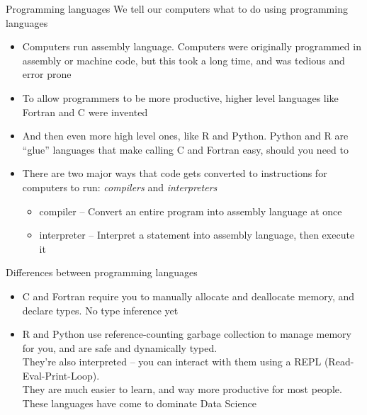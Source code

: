 \documentclass{beamer}
\begin{document}
\begin{frame}{Programming languages}
	We tell our computers what to do using programming languages
	\begin{itemize}	

		\item Computers run assembly language. Computers were originally
		programmed in assembly or machine code, but this took a long time, and
		was tedious and error prone
		
		\item To allow programmers to be more productive, higher level languages
		like Fortran and C were invented

\item  And then even more high level ones, like R and Python. Python and R are
``glue'' languages that make calling C and Fortran easy, should you need to

		\item There are two major ways that code gets converted to instructions for computers to run: \emph{compilers} and \emph{interpreters}
			\begin{itemize}
				\item{compiler} -- Convert an entire program into assembly language at once
				\item{interpreter} -- Interpret a statement into assembly language, then execute it
			\end{itemize}
	\end{itemize}
\end{frame}

\begin{frame}{Differences between programming languages}
	\begin{itemize}	
		\item C and Fortran require you to manually allocate and deallocate
		memory, and declare types. No type inference yet
		
		\item R and Python use reference-counting garbage collection to manage
		memory for you, and are safe and dynamically typed.
		\\
		They're also
		interpreted -- you can interact with them using a REPL (Read-Eval-Print-Loop).
		\\
		They are much easier to learn, and way more productive for most people.
		These languages have come to dominate Data Science
	\end{itemize} 
\end{frame}
\end{document}
